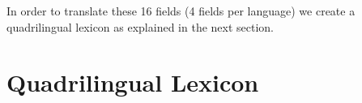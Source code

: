 \documentclass[a4paper,11pt]{article}
\newcommand{\red}[1]{\textcolor{red}{#1}}
\newcommand{\mc}[3]{\multicolumn{#1}{#2}{#3}}
\begin{document}
In order to translate these 16 fields (4 fields per language) we create a quadrilingual lexicon as explained in the next section.
% 
% 
% 
% 
% 


\section{Quadrilingual Lexicon}
\label{s:lexicon}
\end{document}
